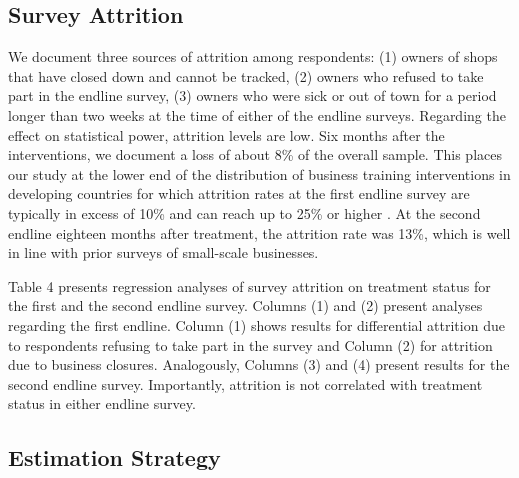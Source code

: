 \documentclass[11.5pt]{article}
\begin{document}
\subsection{Survey Attrition}

We document three sources of attrition among respondents: (1) owners of shops that have closed down and cannot be tracked, (2) owners who refused to take part in the endline survey, (3) owners who were sick or out of town for a period longer than two weeks at the time of either of the endline surveys. Regarding the effect on statistical power, attrition levels are low. Six months after the interventions, we document a loss of about 8\% of the overall sample. This places our study at the lower end of the distribution of business training interventions in developing countries for which attrition rates at the first endline survey are typically in excess of 10\% and can reach up to 25\% or higher \citep[for a review, see][]{McKenzie2014}. At the second endline eighteen months after treatment, the attrition rate was 13\%, which is well in line with prior surveys of small-scale businesses.

Table 4 presents regression analyses of survey attrition on treatment status for the first and the second endline survey. Columns (1) and (2) present analyses regarding the first endline. Column (1) shows results for differential attrition due to respondents refusing to take part in the survey and Column (2) for attrition due to business closures. Analogously, Columns (3) and (4) present results for the second endline survey. Importantly, attrition is not correlated with treatment status in either endline survey.


\subsection{Estimation Strategy}

\end{document}
